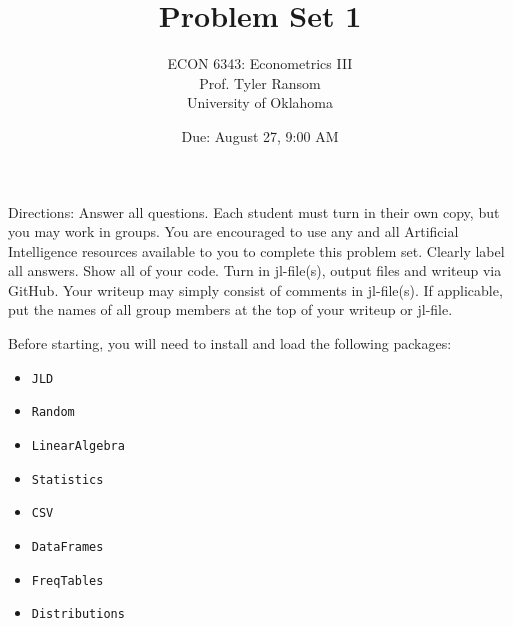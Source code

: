 \documentclass[12pt,english]{article}
\begin{document}
\title{Problem Set 1}
\author{ECON 6343: Econometrics III\\
Prof. Tyler Ransom\\
University of Oklahoma}
\date{Due: August 27, 9:00 AM}

\maketitle
Directions: Answer all questions. Each student must turn in their own copy, but you may work in groups. You are encouraged to use any and all Artificial Intelligence resources available to you to complete this problem set. Clearly label all answers. Show all of your code. Turn in jl-file(s), output files and writeup via GitHub. Your writeup may simply consist of comments in jl-file(s). If applicable, put the names of all group members at the top of your writeup or jl-file.


Before starting, you will need to install and load the following packages:
\begin{itemize}
    \item[~] \texttt{JLD}
    \item[~] \texttt{Random}
    \item[~] \texttt{LinearAlgebra}
    \item[~] \texttt{Statistics}
    \item[~] \texttt{CSV} 
    \item[~] \texttt{DataFrames} 
    \item[~] \texttt{FreqTables} 
    \item[~] \texttt{Distributions} 
\end{itemize}
\end{document}

